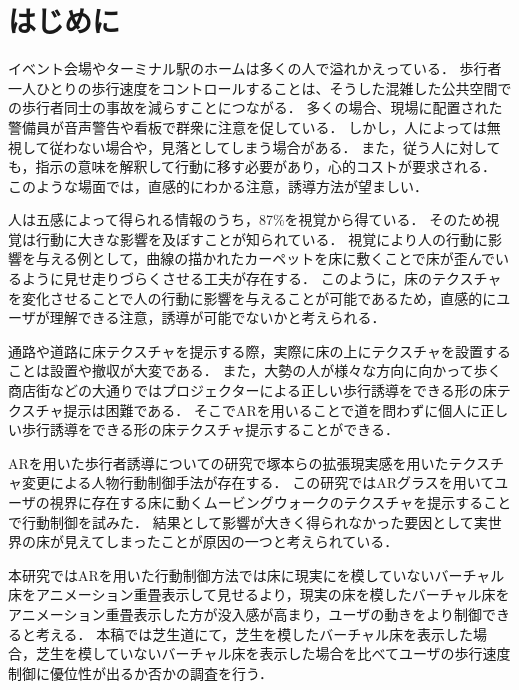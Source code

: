 \documentclass[dvipdfmx]{jsarticle}
\begin{document}

\vspace{3mm}

\section{はじめに}
イベント会場やターミナル駅のホームは多くの人で溢れかえっている．
歩行者一人ひとりの歩行速度をコントロールすることは、そうした混雑した公共空間での歩行者同士の事故を減らすことにつながる．
多くの場合、現場に配置された警備員が音声警告や看板で群衆に注意を促している．
しかし，人によっては無視して従わない場合や，見落としてしまう場合がある．
また，従う人に対しても，指示の意味を解釈して行動に移す必要があり，心的コストが要求される．
このような場面では，直感的にわかる注意，誘導方法が望ましい．


人は五感によって得られる情報のうち，87\%を視覚から得ている\cite{book1}．
そのため視覚は行動に大きな影響を及ぼすことが知られている．
視覚により人の行動に影響を与える例として，曲線の描かれたカーペットを床に敷くことで床が歪んでいるように見せ走りづらくさせる工夫が存在する\cite{webpage1}．
このように，床のテクスチャを変化させることで人の行動に影響を与えることが可能であるため，直感的にユーザが理解できる注意，誘導が可能でないかと考えられる．


通路や道路に床テクスチャを提示する際，実際に床の上にテクスチャを設置することは設置や撤収が大変である．
また，大勢の人が様々な方向に向かって歩く商店街などの大通りではプロジェクターによる正しい歩行誘導をできる形の床テクスチャ提示は困難である．
そこでARを用いることで道を問わずに個人に正しい歩行誘導をできる形の床テクスチャ提示することができる．


ARを用いた歩行者誘導についての研究で塚本らの拡張現実感を用いたテクスチャ変更による人物行動制御手法が存在する．
この研究ではARグラスを用いてユーザの視界に存在する床に動くムービングウォークのテクスチャを提示することで行動制御を試みた．
結果として影響が大きく得られなかった要因として実世界の床が見えてしまったことが原因の一つと考えられている\cite{article1}．


本研究ではARを用いた行動制御方法では床に現実にを模していないバーチャル床をアニメーション重畳表示して見せるより，現実の床を模したバーチャル床をアニメーション重畳表示した方が没入感が高まり，ユーザの動きをより制御できると考える．
本稿では芝生道にて，芝生を模したバーチャル床を表示した場合，芝生を模していないバーチャル床を表示した場合を比べてユーザの歩行速度制御に優位性が出るか否かの調査を行う．
\end{document}
